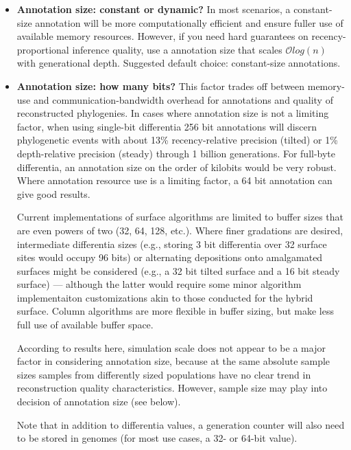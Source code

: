 \begin{itemize}
\item \textbf{Annotation size: constant or dynamic?}
  In most scenarios, a constant-size annotation will be more computationally efficient and ensure fuller use of available memory resources.
  However, if you need hard guarantees on recency-proportional inference quality, use a annotation size that scales $\mathcal{O}log(n)$ with generational depth.
  Suggested default choice: constant-size annotations.
\item \textbf{Annotation size: how many bits?}
  This factor trades off between memory-use and communication-bandwidth overhead for annotations and quality of reconstructed phylogenies.
  In cases where annotation size is not a limiting factor, when using single-bit differentia 256 bit annotations will discern phylogenetic events with about 13\% recency-relative precision (tilted) or 1\% depth-relative precision (steady) through 1 billion generations.
  For full-byte differentia, an annotation size on the order of kilobits would be very robust.
  Where annotation resource use is a limiting factor, a 64 bit annotation can give good results.

  Current implementations of surface algorithms are limited to buffer sizes that are even powers of two (32, 64, 128, etc.).
  Where finer gradations are desired, intermediate differentia sizes (e.g., storing 3 bit differentia over 32 surface sites would occupy 96 bits) or alternating depositions onto amalgamated surfaces might be considered (e.g., a 32 bit tilted surface and a 16 bit steady surface) --- although the latter would require some minor algorithm implementaiton customizations akin to those conducted for the hybrid surface.
  Column algorithms are more flexible in buffer sizing, but make less full use of available buffer space.

  According to results here, simulation scale does not appear to be a major factor in considering annotation size, because at the same absolute sample sizes samples from differently sized populations have no clear trend in reconstruction quality characteristics.
  However, sample size may play into decision of annotation size (see below).

  Note that in addition to differentia values, a generation counter will also need to be stored in genomes (for most use cases, a 32- or 64-bit value).


\end{itemize}
